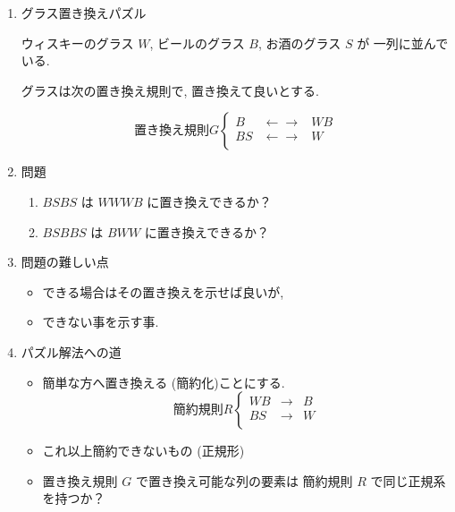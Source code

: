 \documentclass[a4j]{jarticle}
\begin{document}
\begin{enumerate}
\item グラス置き換えパズル
\label{sec:org1098bb3}

ウィスキーのグラス \(W\), ビールのグラス \(B\), お酒のグラス \(S\) が
一列に並んでいる.

グラスは次の置き換え規則で, 置き換えて良いとする.

$$置き換え規則 G \left\{ \begin{array}{rll}
B &  \leftarrow\rightarrow  &  W B\\
BS& \leftarrow\rightarrow   & W  \\
      \end{array}
\right.$$

\item 問題
\label{sec:orgb129d9c}

\begin{enumerate}
\item \(BSBS\) は \(WWWB\) に置き換えできるか？

\item \(BSBBS\) は \(BWW\) に置き換えできるか？
\end{enumerate}

\item 問題の難しい点
\label{sec:orgc2a6775}

\begin{itemize}
\item できる場合はその置き換えを示せば良いが,

\item できない事を示す事.
\end{itemize}

\item パズル解法への道
\label{sec:orgb6de9cb}

\begin{itemize}
\item 簡単な方へ置き換える (簡約化)ことにする.
$$簡約規則 R \left\{ \begin{array}{rll}
   WB & \rightarrow  &  B\\
   BS & \rightarrow   & W  \\
         \end{array}
   \right.$$

\item これ以上簡約できないもの (正規形)

\item 置き換え規則 \(G\) で置き換え可能な列の要素は 簡約規則 \(R\)
で同じ正規系を持つか？


\end{itemize}
\end{enumerate}
\end{document}
